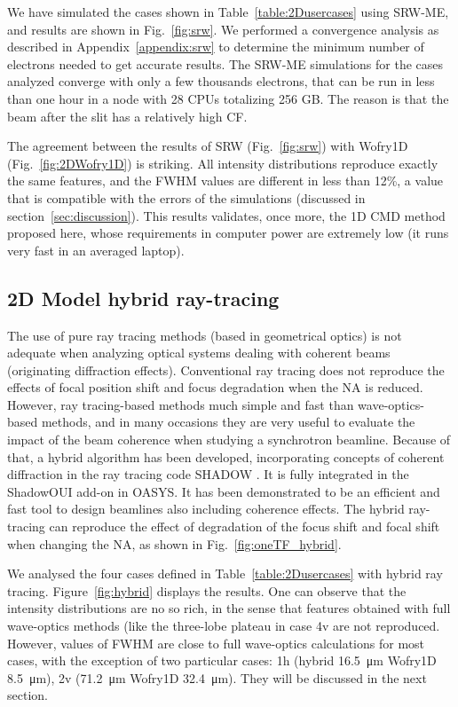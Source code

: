 \documentclass{iucr}              %
\begin{document}
We have simulated the cases shown in Table~\ref{table:2Dusercases} using SRW-ME, and results are shown in Fig.~\ref{fig:srw}. We performed a convergence analysis as described in Appendix~\ref{appendix:srw} to determine the minimum number of electrons needed to get accurate results. The SRW-ME simulations for the cases analyzed converge with only a few thousands electrons, that can be run in less than one hour in a node with 28 CPUs totalizing 256 GB. The reason is that the beam after the slit has a relatively high CF. 

The agreement between the results of SRW (Fig.~\ref{fig:srw}) with Wofry1D (Fig.~\ref{fig:2DWofry1D}) is striking. All intensity distributions reproduce exactly the same features, and the FWHM values are different in less than 12\%, a value that is compatible with the errors of the simulations (discussed in section~\ref{sec:discussion}). This results validates, once more, the 1D CMD method proposed here, whose requirements in computer power are extremely low (it runs very fast in an averaged laptop).  

\subsection{2D Model hybrid ray-tracing}
The use of pure ray tracing methods (based in geometrical optics) is not adequate when analyzing optical systems dealing with coherent beams (originating diffraction effects). Conventional ray tracing does not reproduce the effects of focal position shift and focus degradation when the NA is reduced. However, ray tracing-based methods much simple and fast than wave-optics-based methods, and in many occasions they are very useful to evaluate the impact of the beam coherence when studying a synchrotron beamline. Because of that, a hybrid \cite{codeHYBRID} algorithm has been developed, incorporating concepts of coherent diffraction in the ray tracing code SHADOW \cite{codeSHADOW}. It is fully   integrated in the ShadowOUI \cite{codeSHADOWOUI} add-on in OASYS. It has been demonstrated to be an efficient and fast tool to design beamlines also including coherence effects. The hybrid ray-tracing can reproduce the effect of degradation of the focus shift and focal shift when changing the NA, as shown in Fig.~\ref{fig:oneTF_hybrid}. 

We analysed the four cases defined in Table~\ref{table:2Dusercases} with hybrid ray tracing.  Figure~\ref{fig:hybrid} displays the results.  One can observe that the intensity distributions are no so rich, in the sense that  features obtained with full wave-optics methods (like the three-lobe plateau in case 4v are not reproduced. However, values of FWHM are close to full wave-optics calculations for most cases, with the exception of two particular cases:
1h (hybrid \SI{16.5}{\micro\meter} Wofry1D \SI{8.5}{\micro\meter}),
2v (\SI{71.2}{\micro\meter} Wofry1D \SI{32.4}{\micro\meter}). They will be discussed in the next section.
\end{document}

